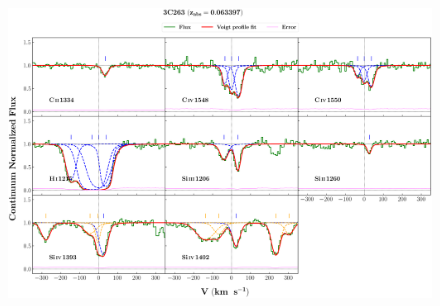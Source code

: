 \documentclass[12pt]{report}
\begin{document}
\begin{landscape}

\begin{figure}
    \centering
    \vspace{-20mm}
    \hspace*{-35mm}
    \includegraphics[width=1.25\linewidth]{System-Plots/3C263_z=0.063397_sys_plot.png}
\end{figure}

\end{landscape}
\end{document}

